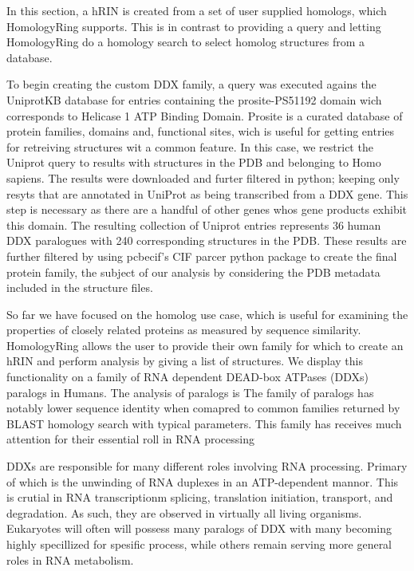 In this section, a hRIN is created from a set of user supplied homologs, which HomologyRing supports. This is in contrast to providing a query and letting HomologyRing do a homology search to select homolog structures from a database. 

To begin creating the custom DDX family, a query was executed agains the UniprotKB database for entries containing the prosite-PS51192 domain wich corresponds to Helicase 1 ATP Binding Domain. Prosite is a curated database of protein families, domains and, functional sites, wich is useful for getting entries for retreiving structures wit a common feature. In this case, we restrict the Uniprot query to results with structures in the PDB and belonging to Homo sapiens. The results were downloaded and furter filtered in python; keeping only resyts that are annotated in UniProt as being transcribed from a DDX gene. This step is necessary as there are a handful of other genes whos gene products exhibit this domain. The resulting collection of Uniprot entries represents 36 human DDX paralogues with 240 corresponding structures in the PDB. These results are further filtered by using pcbecif's CIF parcer python package to create the final protein family, the subject of our analysis by considering the PDB metadata included in the structure files.



So far we have focused on the homolog use case, which is useful for examining the properties of closely related proteins as measured by sequence similarity. HomologyRing allows the user to provide their own family for which to create an hRIN and perform analysis by giving a list of structures. 
We display this functionality on a family of RNA dependent DEAD-box ATPases (DDXs) paralogs in Humans. 
The analysis of paralogs is 
The family of paralogs has notably lower sequence identity when comapred to common families returned by BLAST homology search with typical parameters.
This family has receives much attention for their essential roll in RNA processing


DDXs are responsible for many different roles involving RNA processing. Primary of which is the unwinding of RNA duplexes in an ATP-dependent mannor. This is crutial in RNA transcriptionm splicing, translation initiation, transport, and degradation.
As such, they are observed in virtually all living organisms. Eukaryotes will often will possess many paralogs of DDX with many becoming highly specillized for spesific process, while others remain serving more general roles in RNA metabolism.


